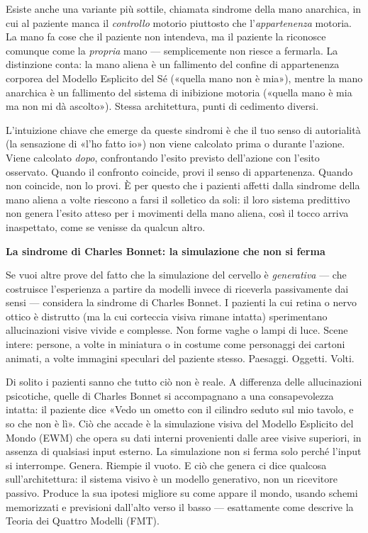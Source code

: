 \documentclass[11pt, twoside, openright]{book}
\begin{document}
Esiste anche una variante più sottile, chiamata sindrome della mano anarchica, in cui al paziente manca il \textit{controllo} motorio piuttosto che l'\textit{appartenenza} motoria. La mano fa cose che il paziente non intendeva, ma il paziente la riconosce comunque come la \textit{propria} mano --- semplicemente non riesce a fermarla. La distinzione conta: la mano aliena è un fallimento del confine di appartenenza corporea del Modello Esplicito del Sé («quella mano non è mia»), mentre la mano anarchica è un fallimento del sistema di inibizione motoria («quella mano è mia ma non mi dà ascolto»). Stessa architettura, punti di cedimento diversi.

L'intuizione chiave che emerge da queste sindromi è che il tuo senso di autorialità (la sensazione di «l'ho fatto io») non viene calcolato prima o durante l'azione. Viene calcolato \textit{dopo}, confrontando l'esito previsto dell'azione con l'esito osservato. Quando il confronto coincide, provi il senso di appartenenza. Quando non coincide, non lo provi. È per questo che i pazienti affetti dalla sindrome della mano aliena a volte riescono a farsi il solletico da soli: il loro sistema predittivo non genera l'esito atteso per i movimenti della mano aliena, così il tocco arriva inaspettato, come se venisse da qualcun altro.

\textbf{La sindrome di Charles Bonnet: la simulazione che non si ferma}

Se vuoi altre prove del fatto che la simulazione del cervello è \textit{generativa} --- che costruisce l'esperienza a partire da modelli invece di riceverla passivamente dai sensi --- considera la sindrome di Charles Bonnet. I pazienti la cui retina o nervo ottico è distrutto (ma la cui corteccia visiva rimane intatta) sperimentano allucinazioni visive vivide e complesse. Non forme vaghe o lampi di luce. Scene intere: persone, a volte in miniatura o in costume come personaggi dei cartoni animati, a volte immagini speculari del paziente stesso. Paesaggi. Oggetti. Volti.

Di solito i pazienti sanno che tutto ciò non è reale. A differenza delle allucinazioni psicotiche, quelle di Charles Bonnet si accompagnano a una consapevolezza intatta: il paziente dice «Vedo un ometto con il cilindro seduto sul mio tavolo, e so che non è lì». Ciò che accade è la simulazione visiva del Modello Esplicito del Mondo (EWM) che opera su dati interni provenienti dalle aree visive superiori, in assenza di qualsiasi input esterno. La simulazione non si ferma solo perché l'input si interrompe. Genera. Riempie il vuoto. E ciò che genera ci dice qualcosa sull'architettura: il sistema visivo è un modello generativo, non un ricevitore passivo. Produce la sua ipotesi migliore su come appare il mondo, usando schemi memorizzati e previsioni dall'alto verso il basso --- esattamente come descrive la Teoria dei Quattro Modelli (FMT).
\end{document}
